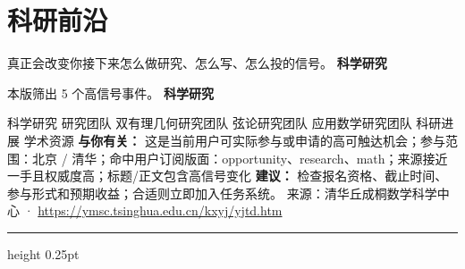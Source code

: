 \documentclass[10.5pt]{ctexart}
\begin{document}
\section*{科研前沿}
{\color{ormuted} 真正会改变你接下来怎么做研究、怎么写、怎么投的信号。}
\vspace{2mm}
{\LARGE\bfseries 科学研究}\par
\vspace{1mm}
{\color{ormuted} 本版筛出 5 个高信号事件。}
\vspace{3mm}
{\Large\bfseries 科学研究}\par
科学研究 研究团队 双有理几何研究团队 弦论研究团队 应用数学研究团队 科研进展 学术资源
\textbf{与你有关：} 这是当前用户可实际参与或申请的高可触达机会；参与范围：北京 / 清华；命中用户订阅版面：opportunity、research、math；来源接近一手且权威度高；标题/正文包含高信号变化
\textbf{建议：} 检查报名资格、截止时间、参与形式和预期收益；合适则立即加入任务系统。
{\footnotesize\color{ormuted} 来源：清华丘成桐数学科学中心 · \url{https://ymsc.tsinghua.edu.cn/kxyj/yjtd.htm}}
\vspace{4mm}
\hrule height 0.25pt
\vspace{3mm}
\end{document}
